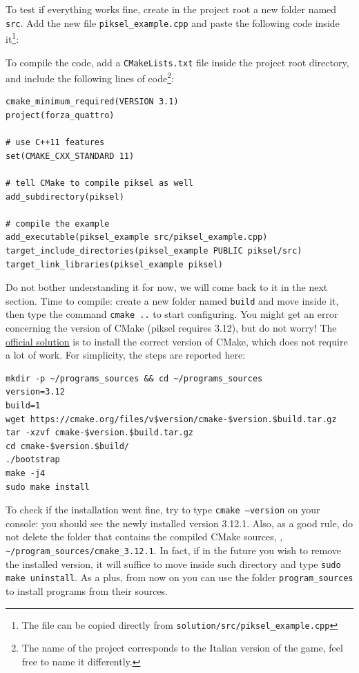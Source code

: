 \documentclass{article}
\begin{document}
To test if everything works fine, create in the project root a new folder named \texttt{src}. Add the new file \texttt{piksel\_example.cpp} and paste the following code inside it\footnote{The file can be copied directly from \texttt{solution/src/piksel\_example.cpp}}:




To compile the code, add a \texttt{CMakeLists.txt} file inside the project root directory, and include the following lines of code\footnote{The name of the project corresponds to the Italian version of the game, feel free to name it differently.}:

\begin{lstlisting}[style=mycmake]
cmake_minimum_required(VERSION 3.1)
project(forza_quattro)

# use C++11 features
set(CMAKE_CXX_STANDARD 11)

# tell CMake to compile piksel as well
add_subdirectory(piksel)

# compile the example
add_executable(piksel_example src/piksel_example.cpp)
target_include_directories(piksel_example PUBLIC piksel/src)
target_link_libraries(piksel_example piksel)
\end{lstlisting}

Do not bother understanding it for now, we will come back to it in the next section. Time to compile: create a new folder named \texttt{build} and move inside it, then type the command \texttt{cmake~..} to start configuring. You might get an error concerning the version of CMake (piksel requires 3.12), but do not worry! The \href{https://bernhardfritz.github.io/piksel/#/gettingstarted/troubleshooting}{official solution} is to install the correct version of CMake, which does not require a lot of work. For simplicity, the steps are reported here:

\begin{center}
\begin{minipage}{.9\textwidth}
\begin{lstlisting}[style=myterm]
mkdir -p ~/programs_sources && cd ~/programs_sources
version=3.12
build=1
wget https://cmake.org/files/v$version/cmake-$version.$build.tar.gz
tar -xzvf cmake-$version.$build.tar.gz
cd cmake-$version.$build/
./bootstrap
make -j4
sudo make install
\end{lstlisting}
\end{minipage}
\end{center}

To check if the installation went fine, try to type \texttt{cmake --version} on your console: you should see the newly installed version 3.12.1. Also, as a good rule, do not delete the folder that contains the compiled CMake sources, \eg, \texttt{\textasciitilde/program\_sources/cmake\_3.12.1}. In fact, if in the future you wish to remove the installed version, it will suffice to move inside such directory and type \texttt{sudo make uninstall}. As a plus, from now on you can use the folder \texttt{program\_sources} to install programs from their sources.
\end{document}
